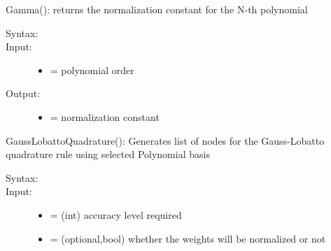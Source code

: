 \documentclass[letterpaper,10pt,english]{sphinxmanual}
\begin{document}
\begin{fulllineitems}

\begin{fulllineitems}
\label{index:SpectralToolbox.Spectral1D.Poly1D.Gamma}
Gamma(): returns the normalization constant for the N-th polynomial
\begin{description}
\item[{Syntax:}] \leavevmode
{}

\item[{Input:}] \leavevmode\begin{itemize}
\item {} 
 = polynomial order

\end{itemize}

\item[{Output:}] \leavevmode\begin{itemize}
\item {} 
 = normalization constant

\end{itemize}

\end{description}

\end{fulllineitems}


\begin{fulllineitems}
\label{index:SpectralToolbox.Spectral1D.Poly1D.GaussLobattoQuadrature}
GaussLobattoQuadrature(): Generates list of nodes for the Gauss-Lobatto quadrature rule using selected Polynomial basis
\begin{description}
\item[{Syntax:}] \leavevmode
{}

\item[{Input:}] \leavevmode\begin{itemize}
\item {} 
 = (int) accuracy level required

\item {} 
 = (optional,bool) whether the weights will be normalized or not


\end{itemize}
\end{description}
\end{fulllineitems}
\end{fulllineitems}
\end{document}
